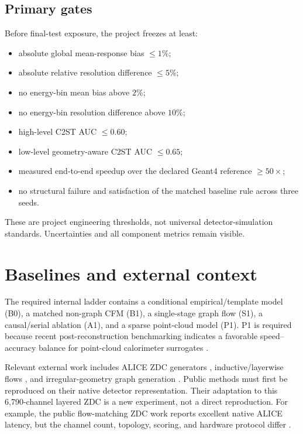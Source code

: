 \documentclass[10pt,a4paper]{article}
\begin{document}
\subsection{Primary gates}
\label{sec:gates}
Before final-test exposure, the project freezes at least:
\begin{itemize}
\item absolute global mean-response bias $\le1\%$;
\item absolute relative resolution difference $\le5\%$;
\item no energy-bin mean bias above $2\%$;
\item no energy-bin resolution difference above $10\%$;
\item high-level C2ST AUC $\le0.60$;
\item low-level geometry-aware C2ST AUC $\le0.65$;
\item measured end-to-end speedup over the declared Geant4 reference $\ge50\times$;
\item no structural failure and satisfaction of the matched baseline rule across three seeds.
\end{itemize}
These are project engineering thresholds, not universal detector-simulation standards. Uncertainties and all component metrics remain visible.

\section{Baselines and external context}

The required internal ladder contains a conditional empirical/template model (B0), a matched non-graph CFM (B1), a single-stage graph flow (S1), a causal/serial ablation (A1), and a sparse point-cloud model (P1). P1 is required because recent post-reconstruction benchmarking indicates a favorable speed--accuracy balance for point-cloud calorimeter surrogates \cite{full_physics_benchmark,calopointflow2}.

Relevant external work includes ALICE ZDC generators \cite{alice_zdc_ml,wojnar_zdc,faster_zdc,expertsim}, inductive/layerwise flows \cite{icaloflow,l2lflows}, and irregular-geometry graph generation \cite{calograph}. Public methods must first be reproduced on their native detector representation. Their adaptation to this 6,790-channel layered ZDC is a new experiment, not a direct reproduction. For example, the public flow-matching ZDC work reports excellent native ALICE latency, but the channel count, topology, scoring, and hardware protocol differ \cite{faster_zdc}.
\end{document}
